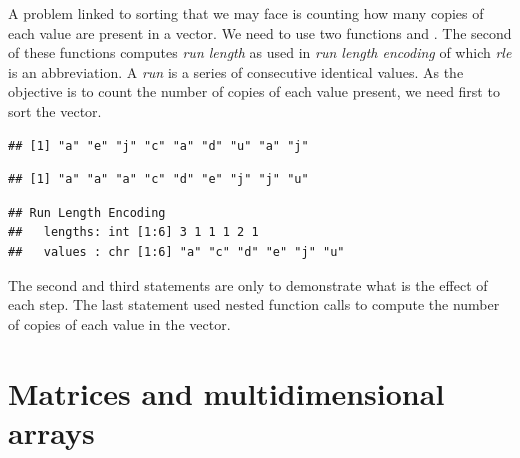 \documentclass[krantz2]{krantz}\usepackage{knitr}%
\begin{document}
\begin{explainbox}
A problem linked to sorting that we may face is counting how many copies of each value are present in a vector. We need to use two functions  and . The second of these functions computes \emph{run length} as used in \emph{run length encoding} of which \emph{rle} is an abbreviation. A \emph{run} is a series of consecutive identical values. As the objective is to count the number of copies of each value present, we need first to sort the vector.

\begin{knitrout}\footnotesize
{}\color{fgcolor}\begin{kframe}
\begin{alltt}
 \hlkwb{<-} \hlstd{letters[}\hlstd{(}\hlstd{,}\hlstd{,}\hlstd{,}\hlstd{,}\hlstd{,}\hlstd{,}\hlstd{,}\hlstd{,}\hlstd{)]}
\end{alltt}
\begin{verbatim}
## [1] "a" "e" "j" "c" "a" "d" "u" "a" "j"
\end{verbatim}
\begin{alltt}
\end{alltt}
\begin{verbatim}
## [1] "a" "a" "a" "c" "d" "e" "j" "j" "u"
\end{verbatim}
\begin{alltt}
\hlstd{(}
\end{alltt}
\begin{verbatim}
## Run Length Encoding
##   lengths: int [1:6] 3 1 1 1 2 1
##   values : chr [1:6] "a" "c" "d" "e" "j" "u"
\end{verbatim}
\end{kframe}
\end{knitrout}

The second and third statements are only to demonstrate what is the effect of each step. The last statement used nested function calls to compute the number of copies of each value in the vector.
\end{explainbox}




\section{Matrices and multidimensional arrays}\label{sec:matrix:array}
\end{document}
